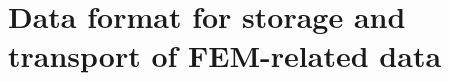 \chapter[Data format examples]{Data format for storage and transport of FEM-related data}
\label{appendix:data-format}

